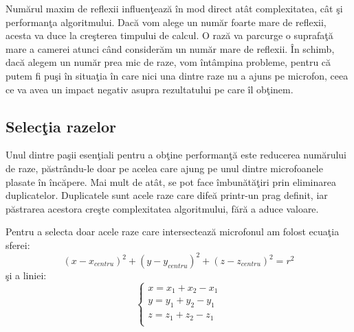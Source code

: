 	Num\u{a}rul maxim de reflexii influen\c{t}eaz\u{a} \^{i}n mod direct at\^{a}t complexitatea, c\^{a}t \c{s}i performan\c{t}a algoritmului. Dac\u{a} vom alege un num\u{a}r foarte mare de reflexii, acesta va duce la cre\c{s}terea timpului de calcul. O raz\u{a} va parcurge o suprafa\c{t}\u{a} mare a camerei atunci c\^{a}nd consider\u{a}m un num\u{a}r mare de reflexii. \^{I}n schimb, dac\u{a} alegem un num\u{a}r prea mic de raze, vom \^{i}nt\^{a}mpina probleme, pentru c\u{a} putem fi pu\c{s}i \^{i}n situa\c{t}ia \^{i}n care nici una dintre raze nu a ajuns pe microfon, ceea ce va avea un impact negativ asupra rezultatului pe care \^{i}l ob\c{t}inem.
	

\subsection{Selec\c{t}ia razelor}

	Unul dintre pa\c{s}ii esen\c{t}iali pentru a ob\c{t}ine performan\c{t}\u{a} este reducerea num\u{a}rului de raze, p\u{a}str\^{a}ndu-le doar pe acelea care ajung pe unul dintre microfoanele plasate \^{i}n \^{i}nc\u{a}pere. Mai mult de at\^{a}t, se pot face \^{i}mbun\u{a}t\u{a}\c{t}iri prin eliminarea duplicatelor. Duplicatele sunt acele raze care dife\u{a} printr-un prag definit, iar p\u{a}strarea acestora cre\c{s}te complexitatea algoritmului, f\u{a}r\u{a} a aduce valoare.
	\bigskip
	
	Pentru a selecta doar acele raze care intersecteaz\u{a} microfonul am folost ecua\c{t}ia sferei\cite{intersectie}:
	\begin{equation}
		(x-x_{centru})^2 + (y-y_{centru})^2 + (z-z_{centru})^2 = r^2
	\end{equation}
	\c{s}i a liniei: 
	\begin{equation}
		\begin{cases}
			x = x_1 + x_2 - x_1\\
			y = y_1 + y_2 - y_1\\
			z = z_1 + z_2 - z_1\\
		\end{cases}
	\end{equation}
	\bigskip
	
